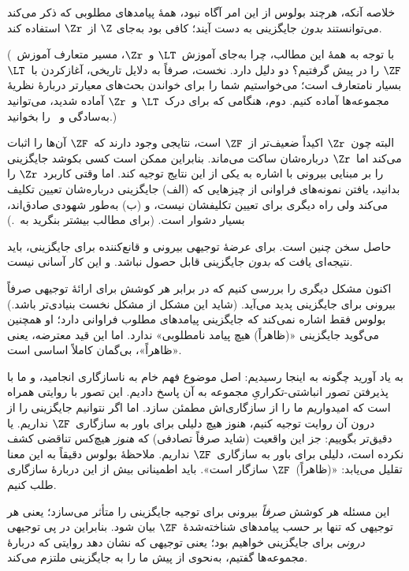 \documentclass[../../../include/open-logic-section]{subfiles}
\begin{document}
خلاصه آنکه، هرچند بولوس از این امر آگاه نبود، همهٔ پیامدهای مطلوبی که
ذکر می‌کند می‌توانستند \emph{بدون} جایگزینی به دست آیند؛ کافی بود به‌جای
$\Z$ از~$\Zr$ استفاده کند.

(با توجه به همهٔ این مطالب، چرا به‌جای آموزش~$\LT$ و~$\Zr$، مسیر متعارف
آموزش~$\ZF$ را در پیش گرفتیم؟ دو دلیل دارد. نخست، صرفاً به دلایل تاریخی،
آغازکردن با~$\LT$ بسیار نامتعارف است؛ می‌خواستیم شما را برای خواندن
بحث‌های معیارتر دربارهٔ نظریهٔ مجموعه‌ها آماده کنیم. دوم، هنگامی که برای
درک~$\LT$ و~$\Zr$ آماده شدید، می‌توانید به‌سادگی
\citealt{Potter2004} و~\citealt{ButtonLT1} را بخوانید.)

البته چون~$\Zr$ اکیداً ضعیف‌تر از~$\ZF$ است، نتایجی وجود دارند که~$\ZF$
آن‌ها را اثبات می‌کند اما~$\Zr$ درباره‌شان ساکت می‌ماند. بنابراین ممکن
است کسی بکوشد جایگزینی را بر مبنایی بیرونی با اشاره به یکی از این نتایج
توجیه کند. اما وقتی کاربرد~$\Zr$ را بدانید، یافتن نمونه‌های فراوانی از
چیزهایی که (الف) جایگزینی درباره‌شان تعیین تکلیف می‌کند ولی راه دیگری
برای تعیین تکلیفشان نیست، و (ب) به‌طور شهودی صادق‌اند، بسیار دشوار است.
(برای مطالب بیشتر بنگرید به~\citealt[\S13.2]{Potter2004}.)

حاصل سخن چنین است. برای عرضهٔ توجیهی بیرونی و قانع‌کننده برای جایگزینی،
باید نتیجه‌ای یافت که \emph{بدون} جایگزینی قابل حصول نباشد. و این کار
آسانی نیست.

اکنون مشکل دیگری را بررسی کنیم که در برابر هر کوشش برای ارائهٔ توجیهی
صرفاً بیرونی برای جایگزینی پدید می‌آید. (شاید این مشکل از مشکل نخست
بنیادی‌تر باشد.) بولوس فقط اشاره نمی‌کند که جایگزینی پیامدهای مطلوب
فراوانی دارد؛ او همچنین می‌گوید جایگزینی «(ظاهراً) هیچ پیامد نامطلوبی»
ندارد. اما این قید معترضه، یعنی «ظاهراً»، بی‌گمان کاملاً اساسی است.

به یاد آورید چگونه به اینجا رسیدیم: اصل موضوع فهم خام به ناسازگاری
انجامید، و ما با پذیرفتن تصور انباشتی-تکراریِ مجموعه به آن پاسخ دادیم.
این تصور با روایتی همراه است که امیدواریم ما را از سازگاری‌اش مطمئن
سازد. اما اگر نتوانیم جایگزینی را از درون آن روایت توجیه کنیم، هنوز هیچ
دلیلی برای باور به سازگاری~$\ZF$ نداریم. یا دقیق‌تر بگوییم: جز این واقعیت
(شاید صرفاً تصادفی) که \emph{هنوز} هیچ‌کس تناقضی کشف نکرده است، دلیلی
برای باور به سازگاری~$\ZF$ نداریم. ملاحظهٔ بولوس دقیقاً به این معنا
تقلیل می‌یابد: «(ظاهراً)~$\ZF$ سازگار است». باید اطمینانی بیش از این
دربارهٔ سازگاری طلب کنیم.

این مسئله هر کوشش \emph{صرفاً} بیرونی برای توجیه جایگزینی را متأثر
می‌سازد؛ یعنی هر توجیهی که تنها بر حسب پیامدهای شناخته‌شدهٔ~$\ZF$ بیان
شود. بنابراین در پی توجیهی \emph{درونی} برای جایگزینی خواهیم بود؛ یعنی
توجیهی که نشان دهد روایتی که دربارهٔ مجموعه‌ها گفتیم، به‌نحوی از پیش ما
را به جایگزینی ملتزم می‌کند.
\end{document}
